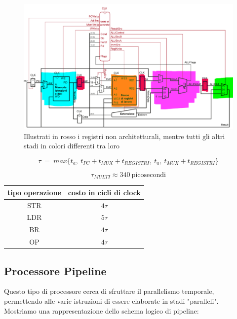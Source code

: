 \documentclass{article}
\begin{document}
\begin{figure}[htbp]
        \center
        \includegraphics[scale=0.45]{img/implementazione_multi_cycle.png}
        \caption{Illustrati in rosso i registri non architetturali, mentre tutti gli altri stadi in colori differenti tra loro}
    \end{figure}

\vspace*{5px}

\[ \tau \: = \: max\{ t_a,\: t_{PC}+t_{MUX}+t_{REGISTRI},\: t_{a},\: t_{MUX}+t_{REGISTRI}  \} \]

\[ \tau_{MULTI} \approx 340 \: \text{picosecondi} \]

\vspace*{20px}

\begin{center}
\begin{tabular}{ |c|c| } %
 \hline
  tipo operazione & costo in cicli di clock \\
  \hline
  STR & $4\tau$ \\
  LDR & $5\tau$ \\
  BR & $4\tau$ \\
  OP & $4\tau$ \\
 \hline
\end{tabular}
\end{center}

\newpage

\subsection{Processore Pipeline}

Questo tipo di processore cerca di sfruttare il parallelismo temporale, permettendo alle varie istruzioni di essere elaborate in stadi "paralleli". Mostriamo una rappresentazione dello schema logico di pipeline:
\end{document}
